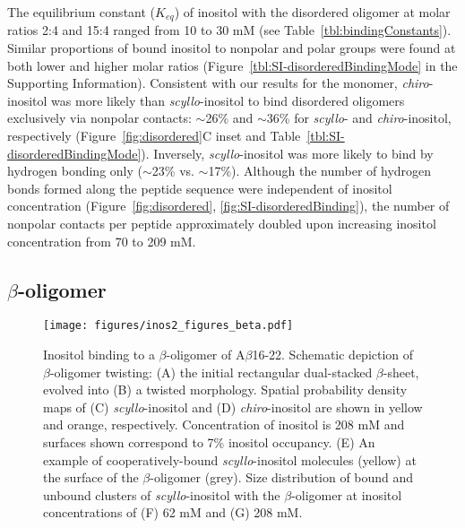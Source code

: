 The equilibrium constant ($K_{eq}$) of inositol with the disordered oligomer at molar ratios 2:4 and 15:4 ranged from 10 to 30 mM (see Table~\ref{tbl:bindingConstants}).
Similar proportions of bound inositol to nonpolar and polar groups were found at both lower and higher molar ratios (Figure~{\ref{tbl:SI-disorderedBindingMode}} in the Supporting Information). Consistent with our results for the monomer, \emph{chiro}-inositol was more likely than \emph{scyllo}-inositol to bind disordered oligomers exclusively via nonpolar contacts: $\sim$26\% and $\sim$36\% for \emph{scyllo}- and \emph{chiro}-inositol, respectively (Figure~\ref{fig:disordered}C inset and Table~\ref{tbl:SI-disorderedBindingMode}).  
Inversely, \emph{scyllo}-inositol was more likely to bind by hydrogen bonding only ($\sim$23\% vs. $\sim$17\%). Although the number of hydrogen bonds formed along the peptide sequence were independent of inositol concentration (Figure~\ref{fig:disordered}, \ref{fig:SI-disorderedBinding}), the number of nonpolar contacts per peptide approximately doubled upon increasing inositol concentration from 70 to 209 mM.

\subsection{$\beta$-oligomer}

\begin{figure}
\texttt{[image: figures/inos2\_figures\_beta.pdf]}
\end{figure}
\begin{figure}[t!]
\caption{Inositol binding to a $\beta$-oligomer of A$\beta$16-22. Schematic depiction of $\beta$-oligomer twisting: (A) the initial rectangular dual-stacked $\beta$-sheet, evolved into (B) a twisted morphology. Spatial probability density maps of (C) \emph{scyllo}-inositol and (D) \emph{chiro}-inositol are shown in yellow and orange, respectively.  Concentration of inositol is 208 mM and surfaces shown correspond to 7\% inositol occupancy. (E) An example of cooperatively-bound \emph{scyllo}-inositol molecules (yellow) at the surface of the $\beta$-oligomer (grey). Size distribution of bound and unbound clusters of \emph{scyllo}-inositol with the $\beta$-oligomer at inositol concentrations of (F) 62 mM and (G) 208 mM.}
\label{fig:beta}
\end{figure}

